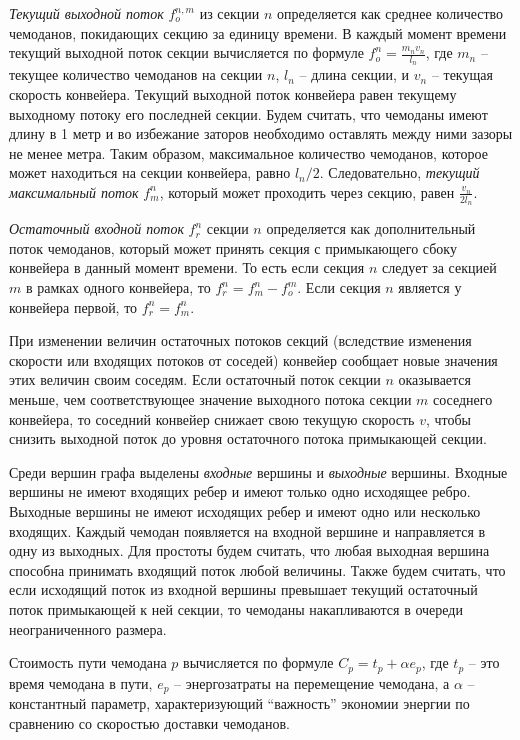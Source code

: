 \documentclass[specification, annotation]{itmo-student-thesis}
\begin{document}
\textit{Текущий выходной поток} $f_o^{n,m}$ из секции $n$ определяется как
среднее количество чемоданов, покидающих секцию за единицу времени. В каждый
момент времени текущий выходной поток секции вычисляется по формуле
$f_o^n = \frac{m_n v_n}{l_n}$, где $m_n$ -- текущее количество чемоданов на
секции $n$, $l_n$ -- длина секции, и $v_n$ -- текущая скорость конвейера.
Текущий выходной поток конвейера равен текущему выходному потоку его последней
секции. Будем считать, что чемоданы имеют длину в 1 метр и во избежание заторов
необходимо оставлять между ними зазоры не менее метра. Таким образом,
максимальное количество чемоданов, которое может находиться на секции конвейера,
равно $l_n/2$. Следовательно, \textit{текущий максимальный поток} $f_m^n$, который может
проходить через секцию, равен $\frac{v_n}{2l_n}$.

\textit{Остаточный входной поток} $f_r^n$ секции $n$ определяется как дополнительный поток
чемоданов, который может принять секция с примыкающего сбоку конвейера в данный момент
времени. То есть если секция $n$ следует за секцией $m$ в рамках одного
конвейера, то $f_r^n = f_m^n - f_o^m$. Если секция $n$ является у конвейера
первой, то $f_r^n = f_m^n$.

При изменении величин остаточных потоков секций (вследствие изменения скорости или
входящих потоков от соседей) конвейер сообщает новые значения этих величин своим
соседям. Если остаточный поток секции $n$ оказывается меньше, чем
соответствующее значение выходного потока секции $m$ соседнего конвейера, то
соседний конвейер снижает свою текущую скорость $v$, чтобы снизить выходной
поток до уровня остаточного потока примыкающей секции.

Среди вершин графа выделены \textit{входные} вершины и \textit{выходные}
вершины. Входные вершины не имеют входящих ребер и имеют только одно исходящее
ребро. Выходные вершины не имеют исходящих ребер и имеют одно или несколько
входящих. Каждый чемодан появляется на входной вершине и направляется в одну из
выходных. Для простоты будем считать, что любая выходная вершина способна
принимать входящий поток любой величины. Также будем считать, что если исходящий
поток из входной вершины превышает текущий остаточный поток примыкающей к ней
секции, то чемоданы накапливаются в очереди неограниченного размера.

Стоимость пути чемодана $p$ вычисляется по формуле $C_p = t_p + \alpha e_p$, где
$t_p$ -- это время чемодана в пути, $e_p$ -- энергозатраты на перемещение чемодана,
а $\alpha$ -- константный параметр, характеризующий ``важность'' экономии
энергии по сравнению со скоростью доставки чемоданов.
\end{document}
